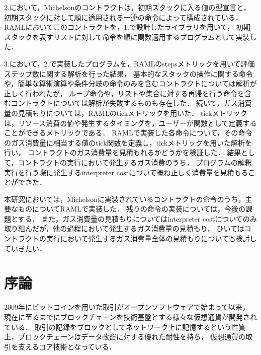 \documentclass{kuisthesis}
\begin{document}
\begin{jabstract}
2.において，Michelsonのコントラクトは，初期スタックに入る値の型宣言と，
初期スタックに対して順に適用される一連の命令によって構成されている．
RAMLにおいてこのコントラクトを，1.で設計したライブラリを用いて，
初期スタックを表すリストに対して命令を順に関数適用するプログラムとして実装した．

3.において，2.で実装したプログラムを，RAMLのstepsメトリックを用いて評価ステップ数に関する解析を行った結果，
基本的なスタックの操作に関する命令や，簡単な算術演算や条件分岐の命令のみを含むコントラクトについては解析が正しく行われたが，
ループ命令や，リストや集合に対する再帰を行う命令を含むコントラクトについては解析が失敗するものも存在した．
続いて，ガス消費量の見積もりについては，RAMLのtickメトリックを用いた．
tickメトリックは，リソース消費の値や発生するタイミングを，ユーザーが関数として定義することができるメトリックである．
RAMLで実装した各命令について，その命令のガス消費量に相当する値のtick関数を定義し，tickメトリックを用いた解析を行い，
コントラクトのガス消費量を見積もれるかどうかを検証した．
結果として，コントラクトの実行において発生するガス消費のうち，
プログラムの解釈実行を行う際に発生するinterpreter costについて概ね正しく消費量を見積もることができた．

本研究においては，Michelsonに実装されているコントラクトの命令のうち，主要なものについてRAMLで実装した．
残りの命令の実装については，今後の課題とする．
また，ガス消費量の見積もりについてはinterpreter costについてのみ取り組んだが，他の過程において発生するガス消費量の見積もり，
ひいてはコントラクトの実行において発生するガス消費量全体の見積もりについても検討していきたい．

\end{jabstract}

\begin{eabstract}

\end{eabstract}

\tableofcontents

\section{序論}\label{sec-intro}
2009年にビットコインを用いた取引がオープンソフトウェアで始まって以来，
現在に至るまでにブロックチェーンを技術基盤とする様々な仮想通貨が開発されている．
取引の記録をブロックとしてネットワーク上に記憶するという性質上，ブロックチェーンはデータ改竄に対する優れた耐性を持ち，
仮想通貨の取引を支えるコア技術となっている．
\end{document}
